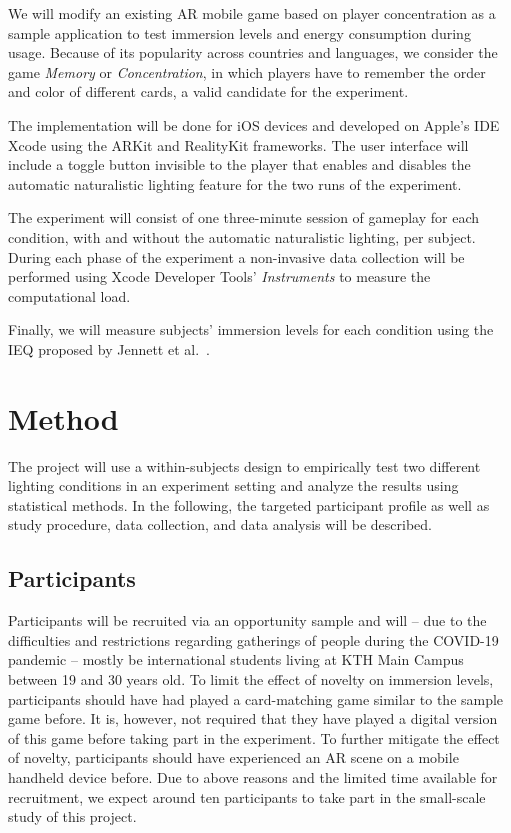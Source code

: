 \documentclass[12pt,twoside,english]{article}
\begin{document}
We will modify an existing \gls{AR} mobile game based on player concentration as a sample application to test immersion levels and energy consumption during usage.
Because of its popularity across countries and languages, we consider the game \textit{Memory} or \textit{Concentration}, in which players have to remember the order and color of different cards, a valid candidate for the experiment.

The implementation will be done for iOS devices and developed on Apple's \gls{IDE} Xcode using the ARKit and RealityKit frameworks.
The user interface will include a toggle button invisible to the player that enables and disables the automatic naturalistic lighting feature for the two runs of the experiment.

The experiment will consist of one three-minute session of gameplay for each condition, with and without the automatic naturalistic lighting, per subject.
During each phase of the experiment a non-invasive data collection will be performed using Xcode Developer Tools' \emph{Instruments} to measure the computational load.

Finally, we will measure subjects' immersion levels for each condition using the \gls{IEQ} proposed by Jennett et al.~\cite{jennett_measuring_2008}.

\section{Method}
\label{sect:method}

The project will use a within-subjects design to empirically test two different lighting conditions in an experiment setting and analyze the results using statistical methods.
In the following, the targeted participant profile as well as study procedure, data collection, and data analysis will be described.

\subsection{Participants}
\label{sect:participants}

Participants will be recruited via an opportunity sample and will -- due to the difficulties and restrictions regarding gatherings of people during the COVID-19 pandemic -- mostly be international students living at KTH Main Campus between 19 and 30 years old.
To limit the effect of novelty on immersion levels, participants should have had played a card-matching game similar to the sample game before.
It is, however, not required that they have played a digital version of this game before taking part in the experiment.
To further mitigate the effect of novelty, participants should have experienced an \gls{AR} scene on a mobile handheld device before.
Due to above reasons and the limited time available for recruitment, we expect around ten participants to take part in the small-scale study of this project.
\end{document}
